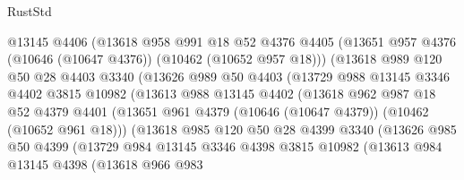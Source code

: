 \begin{lexlean}{RustStd}
\begin{coremodule}
                    @13145
                    @4406
                    (@13618
                      @958
                      @991
                      @18
                      @52
                      @4376
                      @4405
                      (@13651 @957 @4376 (@10646 (@10647 @4376)) (@10462 (@10652 @957 @18)))
                      (@13618
                        @989
                        @120
                        @50
                        @28
                        @4403
                        @3340
                        (@13626
                          @989
                          @50
                          @4403
                          (@13729
                            @988
                            @13145
                            @3346
                            @4402
                            @3815
                            @10982
                            (@13613
                              @988
                              @13145
                              @4402
                              (@13618
                                @962
                                @987
                                @18
                                @52
                                @4379
                                @4401
                                (@13651
                                  @961
                                  @4379
                                  (@10646 (@10647 @4379))
                                  (@10462 (@10652 @961 @18)))
                                (@13618
                                  @985
                                  @120
                                  @50
                                  @28
                                  @4399
                                  @3340
                                  (@13626
                                    @985
                                    @50
                                    @4399
                                    (@13729
                                      @984
                                      @13145
                                      @3346
                                      @4398
                                      @3815
                                      @10982
                                      (@13613
                                        @984
                                        @13145
                                        @4398
                                        (@13618
                                          @966
                                          @983

\end{coremodule}
\end{lexlean}
